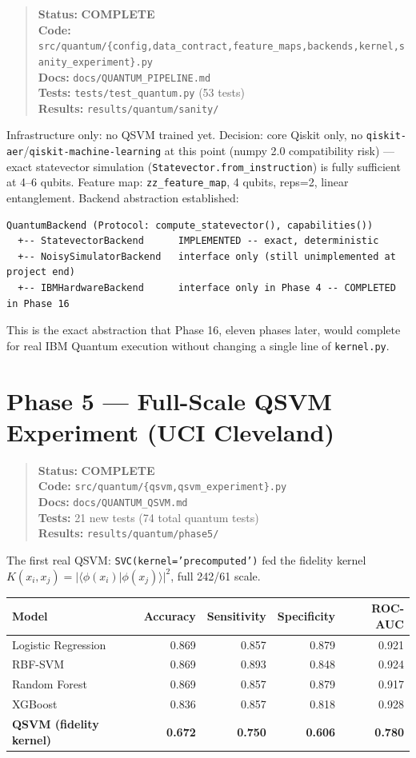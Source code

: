 \documentclass[11pt,a4paper]{article}
\newcommand{\code}[1]{\texttt{\small #1}}
\newcommand{\done}{\textcolor{donecolor}{\textbf{COMPLETE}}}
\newcommand{\phasestatus}[5]{%
\begin{quote}\small\raggedright
\textbf{Status:} #1 \\
\textbf{Code:} #2 \\
\textbf{Docs:} #3 \\
\textbf{Tests:} #4 \\
\textbf{Results:} #5
\end{quote}}
\begin{document}
\phasestatus{\done}{\code{src/quantum/\{config,data\_contract,feature\_maps,backends,kernel,sanity\_experiment\}.py}}{\code{docs/QUANTUM\_PIPELINE.md}}{\code{tests/test\_quantum.py} (53 tests)}{\code{results/quantum/sanity/}}

Infrastructure only: no QSVM trained yet. Decision: core Qiskit only, no \code{qiskit-aer}/\code{qiskit-machine-learning} at this point (numpy 2.0 compatibility risk) --- exact statevector simulation (\code{Statevector.from\_instruction}) is fully sufficient at 4--6 qubits. Feature map: \code{zz\_feature\_map}, 4 qubits, reps=2, linear entanglement. Backend abstraction established:

\begin{center}
\begin{lstlisting}
QuantumBackend (Protocol: compute_statevector(), capabilities())
  +-- StatevectorBackend      IMPLEMENTED -- exact, deterministic
  +-- NoisySimulatorBackend   interface only (still unimplemented at project end)
  +-- IBMHardwareBackend      interface only in Phase 4 -- COMPLETED in Phase 16
\end{lstlisting}
\end{center}

This is the exact abstraction that Phase 16, eleven phases later, would complete for real IBM Quantum execution without changing a single line of \code{kernel.py}.

\section{Phase 5 --- Full-Scale QSVM Experiment (UCI Cleveland)}
\label{sec:phase5}

\phasestatus{\done}{\code{src/quantum/\{qsvm,qsvm\_experiment\}.py}}{\code{docs/QUANTUM\_QSVM.md}}{21 new tests (74 total quantum tests)}{\code{results/quantum/phase5/}}

The first real QSVM: \code{SVC(kernel='precomputed')} fed the fidelity kernel $K(x_i,x_j)=|\langle\phi(x_i)|\phi(x_j)\rangle|^2$, full 242/61 scale.

\begin{center}
\begin{tabular}{lrrrr}
\toprule
\textbf{Model} & \textbf{Accuracy} & \textbf{Sensitivity} & \textbf{Specificity} & \textbf{ROC-AUC} \\
\midrule
Logistic Regression & 0.869 & 0.857 & 0.879 & 0.921 \\
RBF-SVM & 0.869 & 0.893 & 0.848 & 0.924 \\
Random Forest & 0.869 & 0.857 & 0.879 & 0.917 \\
XGBoost & 0.836 & 0.857 & 0.818 & 0.928 \\
\textbf{QSVM (fidelity kernel)} & \textbf{0.672} & \textbf{0.750} & \textbf{0.606} & \textbf{0.780} \\
\bottomrule
\end{tabular}
\end{center}
\end{document}
